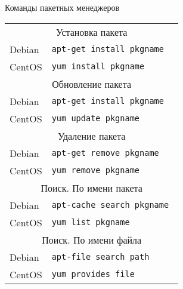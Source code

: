 \begin{frame}{Команды пакетных менеджеров}
        \begin{tabular}{ll}
            \multicolumn{2}{c}{Установка пакета }   \tabularnewline
            Debian & {\tt apt-get \alert{install} pkgname } \\
            CentOS & {\tt yum \alert{install} pkgname } \\
            \multicolumn{2}{c}{Обновление пакета }  \tabularnewline
            Debian & {\tt apt-get \alert{install} pkgname } \\
            CentOS & {\tt yum \alert{update} pkgname }  \\
            \multicolumn{2}{c}{Удаление пакета }   \tabularnewline
            Debian & {\tt apt-get \alert{remove} pkgname } \\ 
            CentOS & {\tt yum \alert{remove} pkgname }  \\
            \multicolumn{2}{c}{Поиск. По имени пакета}   \tabularnewline
            Debian & {\tt apt-cache \alert{search} pkgname } \\
            CentOS & {\tt yum \alert{list} pkgname }  \\
            \multicolumn{2}{c}{Поиск. По имени файла}   \tabularnewline
            Debian & {\tt apt-file \alert{search} path } \\
            CentOS & {\tt yum \alert{provides} file} 
        \end{tabular}
\end{frame}

